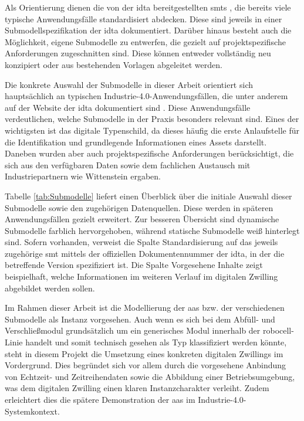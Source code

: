 Als Orientierung dienen die von der \acs{idta} bereitgestellten \acsp{smt} \cite{idtaTemplates}, die bereits viele typische Anwendungsfälle standardisiert abdecken.
Diese sind jeweils in einer Submodellspezifikation der \acs{idta} dokumentiert.
Darüber hinaus besteht auch die Möglichkeit, eigene Submodelle zu entwerfen, die gezielt auf projektspezifische Anforderungen zugeschnitten sind.
Diese können entweder vollständig neu konzipiert oder aus bestehenden Vorlagen abgeleitet werden.

Die konkrete Auswahl der Submodelle in dieser Arbeit orientiert sich hauptsächlich an typischen Industrie-4.0-Anwendungsfällen, die unter anderem auf der Website der \acs{idta} dokumentiert sind \cite{idtaUseCases}.
Diese Anwendungsfälle verdeutlichen, welche Submodelle in der Praxis besonders relevant sind.
Eines der wichtigsten ist das digitale Typenschild, da dieses häufig die erste Anlaufstelle für die Identifikation und grundlegende Informationen eines Assets darstellt.
Daneben wurden aber auch projektspezifische Anforderungen berücksichtigt, die sich aus den verfügbaren Daten sowie dem fachlichen Austausch mit Industriepartnern wie Wittenstein ergaben.

Tabelle \ref{tab:Submodelle} liefert einen Überblick über die initiale Auswahl dieser Submodelle sowie den zugehörigen Datenquellen.
Diese werden in späteren Anwendungsfällen gezielt erweitert.
Zur besseren Übersicht sind dynamische Submodelle farblich hervorgehoben, während statische Submodelle weiß hinterlegt sind.
Sofern vorhanden, verweist die Spalte Standardisierung auf das jeweils zugehörige \acs{smt} mittels der offiziellen Dokumentennummer der \acs{idta}, in der die betreffende Version spezifiziert ist.
Die Spalte Vorgesehene Inhalte zeigt beispielhaft, welche Informationen im weiteren Verlauf im digitalen Zwilling abgebildet werden sollen.

\vspace{0.15em}


\newpage
Im Rahmen dieser Arbeit ist die Modellierung der \acs{aas} bzw. der verschiedenen Submodelle als Instanz vorgesehen.
Auch wenn es sich bei dem Abfüll- und Verschließmodul grundsätzlich um ein generisches Modul innerhalb der robocell-Linie handelt und somit technisch gesehen als Typ klassifiziert werden könnte, steht in diesem Projekt die Umsetzung eines konkreten digitalen Zwillings im Vordergrund.
Dies begründet sich vor allem durch die vorgesehene Anbindung von Echtzeit- und Zeitreihendaten sowie die Abbildung einer Betriebsumgebung, was dem digitalen Zwilling einen klaren Instanzcharakter verleiht.
Zudem erleichtert dies die spätere Demonstration der \acs{aas} im Industrie-4.0-Systemkontext.

